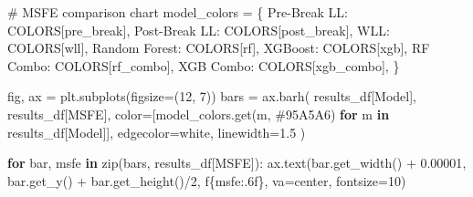 \documentclass[
  letterpaper,
  DIV=11,
  numbers=noendperiod]{scrartcl}
\newenvironment{Shaded}{\begin{snugshade}}{\end{snugshade}}
\newcommand{\BuiltInTok}[1]{\textcolor[rgb]{0.00,0.23,0.31}{#1}}
\newcommand{\CommentTok}[1]{\textcolor[rgb]{0.37,0.37,0.37}{#1}}
\newcommand{\ControlFlowTok}[1]{\textcolor[rgb]{0.00,0.23,0.31}{\textbf{#1}}}
\newcommand{\DecValTok}[1]{\textcolor[rgb]{0.68,0.00,0.00}{#1}}
\newcommand{\FloatTok}[1]{\textcolor[rgb]{0.68,0.00,0.00}{#1}}
\newcommand{\KeywordTok}[1]{\textcolor[rgb]{0.00,0.23,0.31}{\textbf{#1}}}
\newcommand{\NormalTok}[1]{\textcolor[rgb]{0.00,0.23,0.31}{#1}}
\newcommand{\OperatorTok}[1]{\textcolor[rgb]{0.37,0.37,0.37}{#1}}
\newcommand{\SpecialCharTok}[1]{\textcolor[rgb]{0.37,0.37,0.37}{#1}}
\newcommand{\SpecialStringTok}[1]{\textcolor[rgb]{0.13,0.47,0.30}{#1}}
\newcommand{\StringTok}[1]{\textcolor[rgb]{0.13,0.47,0.30}{#1}}
\begin{document}
\begin{Shaded}
\begin{Highlighting}[]
\CommentTok{\# MSFE comparison chart}
\NormalTok{model\_colors }\OperatorTok{=}\NormalTok{ \{}
    \StringTok{\textquotesingle{}Pre{-}Break LL\textquotesingle{}}\NormalTok{: COLORS[}\StringTok{\textquotesingle{}pre\_break\textquotesingle{}}\NormalTok{],}
    \StringTok{\textquotesingle{}Post{-}Break LL\textquotesingle{}}\NormalTok{: COLORS[}\StringTok{\textquotesingle{}post\_break\textquotesingle{}}\NormalTok{],}
    \StringTok{\textquotesingle{}WLL\textquotesingle{}}\NormalTok{: COLORS[}\StringTok{\textquotesingle{}wll\textquotesingle{}}\NormalTok{],}
    \StringTok{\textquotesingle{}Random Forest\textquotesingle{}}\NormalTok{: COLORS[}\StringTok{\textquotesingle{}rf\textquotesingle{}}\NormalTok{],}
    \StringTok{\textquotesingle{}XGBoost\textquotesingle{}}\NormalTok{: COLORS[}\StringTok{\textquotesingle{}xgb\textquotesingle{}}\NormalTok{],}
    \StringTok{\textquotesingle{}RF Combo\textquotesingle{}}\NormalTok{: COLORS[}\StringTok{\textquotesingle{}rf\_combo\textquotesingle{}}\NormalTok{],}
    \StringTok{\textquotesingle{}XGB Combo\textquotesingle{}}\NormalTok{: COLORS[}\StringTok{\textquotesingle{}xgb\_combo\textquotesingle{}}\NormalTok{],}
\NormalTok{\}}

\NormalTok{fig, ax }\OperatorTok{=}\NormalTok{ plt.subplots(figsize}\OperatorTok{=}\NormalTok{(}\DecValTok{12}\NormalTok{, }\DecValTok{7}\NormalTok{))}
\NormalTok{bars }\OperatorTok{=}\NormalTok{ ax.barh(}
\NormalTok{    results\_df[}\StringTok{\textquotesingle{}Model\textquotesingle{}}\NormalTok{], results\_df[}\StringTok{\textquotesingle{}MSFE\textquotesingle{}}\NormalTok{],}
\NormalTok{    color}\OperatorTok{=}\NormalTok{[model\_colors.get(m, }\StringTok{\textquotesingle{}\#95A5A6\textquotesingle{}}\NormalTok{) }\ControlFlowTok{for}\NormalTok{ m }\KeywordTok{in}\NormalTok{ results\_df[}\StringTok{\textquotesingle{}Model\textquotesingle{}}\NormalTok{]],}
\NormalTok{    edgecolor}\OperatorTok{=}\StringTok{\textquotesingle{}white\textquotesingle{}}\NormalTok{, linewidth}\OperatorTok{=}\FloatTok{1.5}
\NormalTok{)}

\ControlFlowTok{for}\NormalTok{ bar, msfe }\KeywordTok{in} \BuiltInTok{zip}\NormalTok{(bars, results\_df[}\StringTok{\textquotesingle{}MSFE\textquotesingle{}}\NormalTok{]):}
\NormalTok{    ax.text(bar.get\_width() }\OperatorTok{+} \FloatTok{0.00001}\NormalTok{, bar.get\_y() }\OperatorTok{+}\NormalTok{ bar.get\_height()}\OperatorTok{/}\DecValTok{2}\NormalTok{,}
            \SpecialStringTok{f\textquotesingle{}}\SpecialCharTok{\{}\NormalTok{msfe}\SpecialCharTok{:.6f\}}\SpecialStringTok{\textquotesingle{}}\NormalTok{, va}\OperatorTok{=}\StringTok{\textquotesingle{}center\textquotesingle{}}\NormalTok{, fontsize}\OperatorTok{=}\DecValTok{10}\NormalTok{)}


\end{Highlighting}
\end{Shaded}
\end{document}
